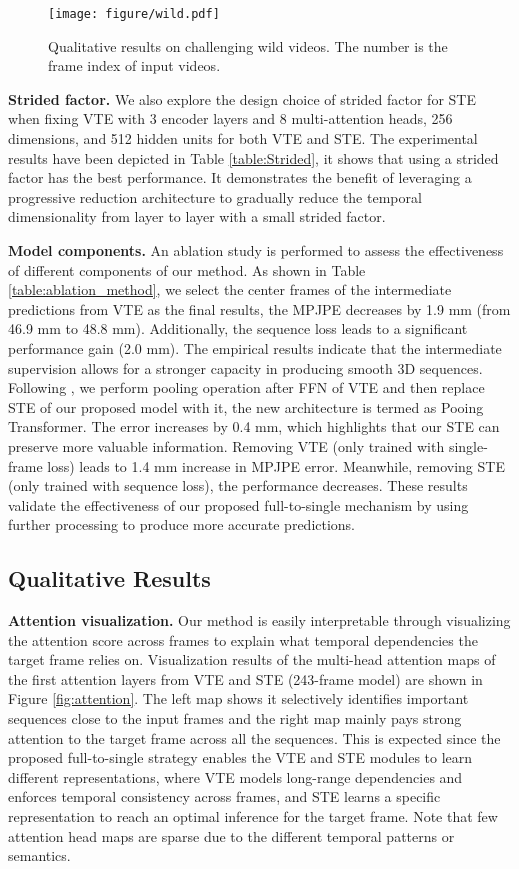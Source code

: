 \documentclass[10pt,twocolumn,letterpaper]{article}
\begin{document}
\begin{figure}[t]
	\centering
	\texttt{[image: figure/wild.pdf]}
	\caption
	{
      Qualitative results on challenging wild videos. 
      The number is the frame index of input videos.
	}
	\label{fig:wild}
\end{figure}

\textbf{Strided factor. }
We also explore the design choice of strided factor for STE when fixing VTE with 3 encoder layers and 8 multi-attention heads, 256 dimensions, and 512 hidden units for both VTE and STE. 
The experimental results have been depicted in Table \ref{table:Strided}, it shows that using a strided factor  has the best performance. 
It demonstrates the benefit of leveraging a progressive reduction architecture to gradually reduce the temporal dimensionality from layer to layer with a small strided factor. 

\textbf{Model components. }
An ablation study is performed to assess the effectiveness of different components of our method. 
As shown in Table \ref{table:ablation_method}, we select the center frames of the intermediate predictions from VTE as the final results, the MPJPE decreases by 1.9 mm (from 46.9 mm to 48.8 mm). 
Additionally, the sequence loss  leads to a significant performance gain (2.0 mm). 
The empirical results indicate that the intermediate supervision allows for a stronger capacity in producing smooth 3D sequences. 
Following \cite{zihang2020funnel-transformer}, we perform pooling operation after FFN of VTE and then replace STE of our proposed model with it, the new architecture is termed as Pooing Transformer. 
The error increases by 0.4 mm, which highlights that our STE can preserve more valuable information. 
Removing VTE (only trained with single-frame loss) leads to 1.4 mm increase in MPJPE error. 
Meanwhile, removing STE (only trained with sequence loss), the performance decreases. 
These results validate the effectiveness of our proposed full-to-single mechanism by using further processing to produce more accurate predictions. 

\subsection{Qualitative Results}
\textbf{Attention visualization. }
Our method is easily interpretable through visualizing the attention score across frames to explain what temporal dependencies the target frame relies on. 
Visualization results of the multi-head attention maps of the first attention layers from VTE and STE (243-frame model) are shown in Figure \ref{fig:attention}. 
The left map shows it selectively identifies important sequences close to the input frames \cite{Wu2020LiteTransformer,jiang2020convbert} and the right map mainly pays strong attention to the target frame across all the sequences. 
This is expected since the proposed full-to-single strategy enables the VTE and STE modules to learn different representations, where VTE models long-range dependencies and enforces temporal consistency across frames, and STE learns a specific representation to reach an optimal inference for the target frame. 
Note that few attention head maps are sparse due to the different temporal patterns or semantics. 
\end{document}
